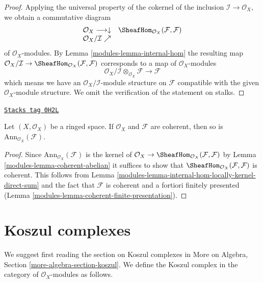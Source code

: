 \begin{proof}

Applying the universal property of the cokernel of the inclusion
$\mathcal{I} \to \mathcal{O}_X$, we obtain a commutative diagram
$$
\begin{array}{cc}\mathcal{O}_X \longrightarrow\downarrow & \SheafHom_{\mathcal{O}_X}(\mathcal{F}, \mathcal{F}) \\ \mathcal{O}_X/\mathcal{I} \nearrow & \end{array}
$$
of $\mathcal{O}_X$-modules. By Lemma \ref{modules-lemma-internal-hom}
the resulting map $\mathcal{O}_X/\mathcal{I} \to
\SheafHom_{\mathcal{O}_X}(\mathcal{F}, \mathcal{F})$
corresponds to a map of $\mathcal{O}_X$-modules
$$
\mathcal{O}_X/\mathcal{I} \otimes_{\mathcal{O}_X} \mathcal{F}
\longrightarrow
\mathcal{F}
$$
which means we have an $\mathcal{O}_X/\mathcal{I}$-module structure
on $\mathcal{F}$ compatible with the given $\mathcal{O}_X$-module structure.
We omit the verification of the statement on stalks.
\end{proof}

\begin{lemma}
\label{modules-lemma-coherent-annihilator}
\href{https://stacks.math.columbia.edu/tag/0H2L}{\texttt{Stacks tag 0H2L}}

Let $(X,\mathcal{O}_X)$ be a ringed space.
If $\mathcal{O}_X$ and $\mathcal{F}$ are coherent,
then so is $\text{Ann}_{\mathcal{O}_X}(\mathcal{F})$.
\end{lemma}

\begin{proof}

Since $\text{Ann}_{\mathcal{O}_X}(\mathcal{F})$ is the kernel of
$\mathcal{O}_X \to \SheafHom_{\mathcal{O}_X}(\mathcal{F}, \mathcal{F})$
by Lemma \ref{modules-lemma-coherent-abelian} it suffices
to show that $\SheafHom_{\mathcal{O}_X}(\mathcal{F}, \mathcal{F})$ is
coherent. This follows from
Lemma \ref{modules-lemma-internal-hom-locally-kernel-direct-sum}
and the fact that $\mathcal{F}$ is coherent and a fortiori finitely presented
(Lemma \ref{modules-lemma-coherent-finite-presentation}).
\end{proof}

\section{Koszul complexes}
\label{modules-section-koszul-complex}
We suggest first reading the section on Koszul complexes in
More on Algebra, Section \ref{more-algebra-section-koszul}.
We define the Koszul complex in the category of $\mathcal{O}_X$-modules
as follows.

